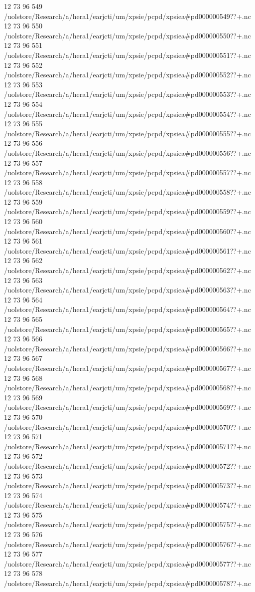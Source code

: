 12 73 96
549
/uolstore/Research/a/hera1/earjcti/um/xpsie/pcpd/xpsiea#pd000000549??+.nc
12 73 96
550
/uolstore/Research/a/hera1/earjcti/um/xpsie/pcpd/xpsiea#pd000000550??+.nc
12 73 96
551
/uolstore/Research/a/hera1/earjcti/um/xpsie/pcpd/xpsiea#pd000000551??+.nc
12 73 96
552
/uolstore/Research/a/hera1/earjcti/um/xpsie/pcpd/xpsiea#pd000000552??+.nc
12 73 96
553
/uolstore/Research/a/hera1/earjcti/um/xpsie/pcpd/xpsiea#pd000000553??+.nc
12 73 96
554
/uolstore/Research/a/hera1/earjcti/um/xpsie/pcpd/xpsiea#pd000000554??+.nc
12 73 96
555
/uolstore/Research/a/hera1/earjcti/um/xpsie/pcpd/xpsiea#pd000000555??+.nc
12 73 96
556
/uolstore/Research/a/hera1/earjcti/um/xpsie/pcpd/xpsiea#pd000000556??+.nc
12 73 96
557
/uolstore/Research/a/hera1/earjcti/um/xpsie/pcpd/xpsiea#pd000000557??+.nc
12 73 96
558
/uolstore/Research/a/hera1/earjcti/um/xpsie/pcpd/xpsiea#pd000000558??+.nc
12 73 96
559
/uolstore/Research/a/hera1/earjcti/um/xpsie/pcpd/xpsiea#pd000000559??+.nc
12 73 96
560
/uolstore/Research/a/hera1/earjcti/um/xpsie/pcpd/xpsiea#pd000000560??+.nc
12 73 96
561
/uolstore/Research/a/hera1/earjcti/um/xpsie/pcpd/xpsiea#pd000000561??+.nc
12 73 96
562
/uolstore/Research/a/hera1/earjcti/um/xpsie/pcpd/xpsiea#pd000000562??+.nc
12 73 96
563
/uolstore/Research/a/hera1/earjcti/um/xpsie/pcpd/xpsiea#pd000000563??+.nc
12 73 96
564
/uolstore/Research/a/hera1/earjcti/um/xpsie/pcpd/xpsiea#pd000000564??+.nc
12 73 96
565
/uolstore/Research/a/hera1/earjcti/um/xpsie/pcpd/xpsiea#pd000000565??+.nc
12 73 96
566
/uolstore/Research/a/hera1/earjcti/um/xpsie/pcpd/xpsiea#pd000000566??+.nc
12 73 96
567
/uolstore/Research/a/hera1/earjcti/um/xpsie/pcpd/xpsiea#pd000000567??+.nc
12 73 96
568
/uolstore/Research/a/hera1/earjcti/um/xpsie/pcpd/xpsiea#pd000000568??+.nc
12 73 96
569
/uolstore/Research/a/hera1/earjcti/um/xpsie/pcpd/xpsiea#pd000000569??+.nc
12 73 96
570
/uolstore/Research/a/hera1/earjcti/um/xpsie/pcpd/xpsiea#pd000000570??+.nc
12 73 96
571
/uolstore/Research/a/hera1/earjcti/um/xpsie/pcpd/xpsiea#pd000000571??+.nc
12 73 96
572
/uolstore/Research/a/hera1/earjcti/um/xpsie/pcpd/xpsiea#pd000000572??+.nc
12 73 96
573
/uolstore/Research/a/hera1/earjcti/um/xpsie/pcpd/xpsiea#pd000000573??+.nc
12 73 96
574
/uolstore/Research/a/hera1/earjcti/um/xpsie/pcpd/xpsiea#pd000000574??+.nc
12 73 96
575
/uolstore/Research/a/hera1/earjcti/um/xpsie/pcpd/xpsiea#pd000000575??+.nc
12 73 96
576
/uolstore/Research/a/hera1/earjcti/um/xpsie/pcpd/xpsiea#pd000000576??+.nc
12 73 96
577
/uolstore/Research/a/hera1/earjcti/um/xpsie/pcpd/xpsiea#pd000000577??+.nc
12 73 96
578
/uolstore/Research/a/hera1/earjcti/um/xpsie/pcpd/xpsiea#pd000000578??+.nc

